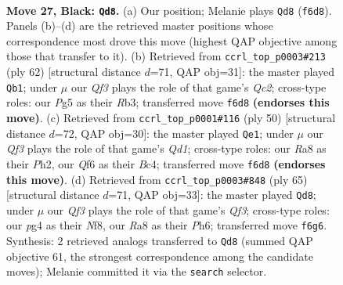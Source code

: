 \documentclass[11pt]{article}
\begin{document}
\clearpage

\begin{figure}[p]\centering
\begin{subfigure}{0.46\textwidth}\centering
\resizebox{\linewidth}{!}{%
\newchessgame
\chessboard[
  setfen={r5k1/2p2p2/r4q1p/2p1p1p1/2P1P1P1/3P2KQ/8/1NB2R2 b - - 11 27},
  showmover=false,
  pgfstyle=straightmove, color=movearrow, markmove={f6-d8}
]}
\caption{}
\end{subfigure}\hfill
\begin{subfigure}{0.46\textwidth}\centering
\resizebox{\linewidth}{!}{%
\newchessgame
\chessboard[
  setfen={2r3k1/p4p1p/6pP/8/3b2q1/PR1P4/2Q1PP2/4KR2 w - - 1 32},
  showmover=false,
  pgfstyle=straightmove, color=movearrow, markmove={c2-b1}
]}
\caption{}
\end{subfigure}
\\[4pt]
\begin{subfigure}{0.46\textwidth}\centering
\resizebox{\linewidth}{!}{%
\newchessgame
\chessboard[
  setfen={3r3k/p1q2p1p/4pb2/5p2/2B2P2/PP2PP2/7P/3Q1R1K w - - 1 26},
  showmover=false,
  pgfstyle=straightmove, color=movearrow, markmove={d1-e1}
]}
\caption{}
\end{subfigure}\hfill
\begin{subfigure}{0.46\textwidth}\centering
\resizebox{\linewidth}{!}{%
\newchessgame
\chessboard[
  setfen={5n2/1p3rk1/p1p1pq1p/P7/1P1P2P1/7P/3Q1RB1/6K1 b - - 3 33},
  showmover=false,
  pgfstyle=straightmove, color=movearrow, markmove={f6-d8}
]}
\caption{}
\end{subfigure}
\caption{\textbf{Move 27, Black: \texttt{Qd8}.} (a) Our position; Melanie plays \texttt{Qd8} (\texttt{f6d8}). Panels (b)--(d) are the retrieved master positions whose correspondence most drove this move (highest QAP objective among those that transfer to it). (b) Retrieved from \texttt{ccrl\_top\_p0003\#213} (ply 62) [structural distance $d$=71, QAP obj=31]: the master played \texttt{Qb1}; under $\mu$ our \emph{Qf3} plays the role of that game's \emph{Qc2}; cross-type roles: our \emph{P}g5 as their \emph{R}b3; transferred move \texttt{f6d8} \textbf{(endorses this move)}. (c) Retrieved from \texttt{ccrl\_top\_p0001\#116} (ply 50) [structural distance $d$=72, QAP obj=30]: the master played \texttt{Qe1}; under $\mu$ our \emph{Qf3} plays the role of that game's \emph{Qd1}; cross-type roles: our \emph{R}a8 as their \emph{P}h2, our \emph{Q}f6 as their \emph{B}c4; transferred move \texttt{f6d8} \textbf{(endorses this move)}. (d) Retrieved from \texttt{ccrl\_top\_p0003\#848} (ply 65) [structural distance $d$=71, QAP obj=33]: the master played \texttt{Qd8}; under $\mu$ our \emph{Qf3} plays the role of that game's \emph{Qf3}; cross-type roles: our \emph{p}g4 as their \emph{N}f8, our \emph{R}a8 as their \emph{P}h6; transferred move \texttt{f6g6}. Synthesis: 2 retrieved analogs transferred to \texttt{Qd8} (summed QAP objective 61, the strongest correspondence among the candidate moves); Melanie committed it via the \texttt{search} selector.}
\label{fig:thought-m53}
\end{figure}
\end{document}
